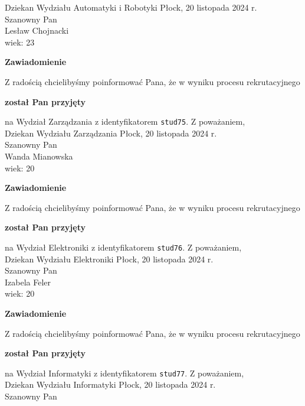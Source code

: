 \documentclass[12pt,a4paper]{article}
\begin{document}
Dziekan
Wydziału Automatyki i Robotyki
\newpage
\hfill Płock, 20 listopada 2024 r.\\
\noindent 
Szanowny Pan \\
Lesław Chojnacki \\
wiek: 23
\bigskip
\begin{center}
 	{\Large\textbf{Zawiadomienie}}
\end{center}
\bigskip
Z radością chcielibyśmy poinformować Pana, że w wyniku procesu rekrutacyjnego 
\begin{center}
\textsf{\textbf{został Pan przyjęty}} 
\end{center}
na Wydział Zarządzania z identyfikatorem \verb|stud75|. 
\vspace{2cm}
\noindent
Z poważaniem,\\
Dziekan
Wydziału Zarządzania
\newpage
\hfill Płock, 20 listopada 2024 r.\\
\noindent 
Szanowny Pan \\
Wanda Mianowska \\
wiek: 20
\bigskip
\begin{center}
 	{\Large\textbf{Zawiadomienie}}
\end{center}
\bigskip
Z radością chcielibyśmy poinformować Pana, że w wyniku procesu rekrutacyjnego 
\begin{center}
\textsf{\textbf{został Pan przyjęty}} 
\end{center}
na Wydział Elektroniki z identyfikatorem \verb|stud76|. 
\vspace{2cm}
\noindent
Z poważaniem,\\
Dziekan
Wydziału Elektroniki
\newpage
\hfill Płock, 20 listopada 2024 r.\\
\noindent 
Szanowny Pan \\
Izabela Feler \\
wiek: 20
\bigskip
\begin{center}
 	{\Large\textbf{Zawiadomienie}}
\end{center}
\bigskip
Z radością chcielibyśmy poinformować Pana, że w wyniku procesu rekrutacyjnego 
\begin{center}
\textsf{\textbf{został Pan przyjęty}} 
\end{center}
na Wydział Informatyki z identyfikatorem \verb|stud77|. 
\vspace{2cm}
\noindent
Z poważaniem,\\
Dziekan
Wydziału Informatyki
\newpage
\hfill Płock, 20 listopada 2024 r.\\
\noindent 
Szanowny Pan \\
\end{document}
